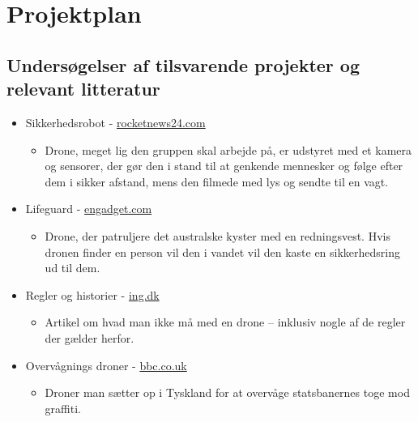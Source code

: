 \documentclass[Main]{subfiles}
\begin{document}
\chapter{Projektplan}


\section{Undersøgelser af tilsvarende projekter og relevant litteratur}


	\begin{itemize}
	\item Sikkerhedsrobot - \href{http://en.rocketnews24.com/2012/12/29/secom-unveils-worlds-first-flying-crime-prevention-robot/}{rocketnews24.com}
	
		\begin{itemize}
		\item Drone, meget lig den gruppen skal arbejde på, er udstyret med et kamera og sensorer, der gør den i stand til at genkende mennesker og følge efter dem i sikker afstand, mens den filmede med lys og sendte til en vagt.
		\end{itemize}
	
	
	\item Lifeguard - \href{http://www.engadget.com/2012/09/19/uav-lifeguards-to-patrol-australian-beaches/}{engadget.com}
	
		\begin{itemize}
		\item Drone, der patruljere det australske kyster med en redningsvest. 
		Hvis dronen finder en person vil den i vandet vil den kaste en  sikkerhedsring ud til dem.
		\end{itemize}
	
	
	\item Regler og historier - \href{http://ing.dk/artikel/foerste-droneflyver-meldt-til-politiet-159138}{ing.dk}
	
		\begin{itemize}
		\item Artikel om hvad man ikke må med en drone -- inklusiv nogle af de regler der gælder herfor.
		\end{itemize}
	
	
	\item Overvågnings droner - \href{http://www.bbc.co.uk/news/world-europe-22678580}{bbc.co.uk}
	
		\begin{itemize}
		\item Droner man sætter op i Tyskland for at overvåge statsbanernes toge mod graffiti.
		\end{itemize}
	

\end{itemize}
\end{document}
